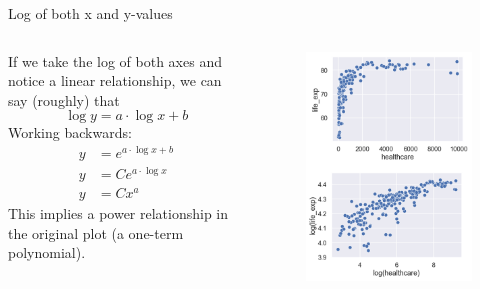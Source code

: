 \documentclass[aspectratio=169]{../latex_main/tntbeamer}  %
\begin{document}
	
	\begin{frame}{Log of both x and y-values}
	    \begin{columns}
	        \begin{column}{.5\textwidth}
	                If we take the log of both axes and notice a linear relationship, we can say (roughly) that
	                \begin{equation*}
	                    \log y = a\cdot \log x + b
	                \end{equation*}
	                Working backwards:
	                \begin{align*}
	                    y &= e^{a\cdot \log x+b}\\
	                    y &= Ce^{a\cdot \log x}\\
	                    y &= Cx^a
	                \end{align*}
	                This implies a power relationship in the original plot (a one-term polynomial).
	        \end{column}
	        
	        
	        \begin{column}{.5\textwidth}
	                \begin{figure}
	                    \includegraphics[scale=.33]{Bild97}
	                \end{figure}
	        \end{column}
	    \end{columns}
	\end{frame}
	
\end{document}
